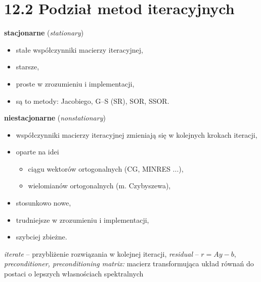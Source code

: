 \section{12.2 Podział metod iteracyjnych}

\begin{frame}{}
  \begin{block}{\textbf{stacjonarne} (\emph{stationary})}
    \begin{itemize}
      \item stałe współczynniki macierzy iteracyjnej,
      \item starsze,
      \item proste w zrozumieniu i implementacji,
      \item są to metody: Jacobiego, G--S (SR), SOR, SSOR.
    \end{itemize}
  \end{block}
\end{frame}

\begin{frame}{}
  \begin{block}{\textbf{niestacjonarne} (\emph{nonstationary})}
    \begin{itemize}
      \item współczynniki macierzy iteracyjnej zmieniają się w kolejnych krokach iteracji,
      \item oparte na idei
      \begin{itemize}
        \item ciągu wektorów ortogonalnych (CG, MINRES ...),
        \item wielomianów ortogonalnych (m. Czybyszewa),
      \end{itemize}
      \item stosunkowo nowe,
      \item trudniejsze w zrozumieniu i implementacji,
      \item szybciej zbieżne.
    \end{itemize}
  \end{block}
\end{frame}

\begin{frame}{}
  \begin{block}{}
    \emph{iterate} -- przybliżenie rozwiązania w kolejnej iteracji,
    \newline \emph{residual} -- $r=Ay-b$,
    \newline \emph{preconditioner, preconditioning matrix:} macierz transformująca układ równań do postaci o lepszych własnościach spektralnych
  \end{block}
\end{frame}
